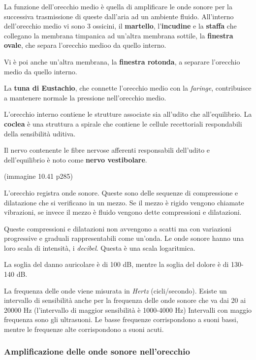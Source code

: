 \documentclass[]{article}
\begin{document}
La funzione dell'orecchio medio è quella di amplificare le onde sonore
per la successiva trasmissione di queste dall'aria ad un ambiente
fluido. All'interno dell'orecchio medio vi sono 3 ossicini, il
\textbf{martello}, l'\textbf{incudine} e la \textbf{staffa} che
collegano la membrana timpanica ad un'altra membrana sottile, la
\textbf{finestra ovale}, che separa l'orecchio medioo da quello interno.

Vi è poi anche un'altra membrana, la \textbf{finestra rotonda}, a
separare l'orecchio medio da quello interno.

La \textbf{tuna di Eustachio}, che connette l'orecchio medio con la
\emph{faringe}, contribuisce a mantenere normale la pressione
nell'orecchio medio.

L'orecchio interno contiene le strutture associate sia all'udito che
all'equilibrio. La \textbf{coclea} è una struttura a spirale che
contiene le cellule recettoriali respondabili della sensibilità uditiva.

Il nervo contenente le fibre nervose afferenti responsabili dell'udito e
dell'equilibrio è noto come \textbf{nervo vestibolare}.

(immagine 10.41 p285)

L'orecchio registra onde sonore. Queste sono delle sequenze di
compressione e dilatazione che si verificano in un mezzo. Se il mezzo è
rigido vengono chiamate vibrazioni, se invece il mezzo è fluido vengono
dette compressioni e dilatazioni.

Queste compressioni e dilatazioni non avvengono a scatti ma con
variazioni progressive e graduali rappresentabili come un'onda. Le onde
sonore hanno una loro scala di intensità, i \emph{decibel}. Questa è una
scala logaritmica.

La soglia del danno auricolare è di 100 dB, mentre la soglia del dolore
è di 130-140 dB.

La frequenza delle onde viene misurata in \emph{Hertz} (cicli/secondo).
Esiste un intervallo di sensibilità anche per la frequenza delle onde
sonore che va dai 20 ai 20000 Hz (l'intervallo di maggior sensibilità è
1000-4000 Hz) Intervalli con maggio frequenza sono gli ultrasuoni. Le
basse frequenze corrispondono a suoni bassi, mentre le frequenze alte
corrispondono a suoni acuti.

\subsubsection{Amplificazione delle onde sonore
nell'orecchio}\label{amplificazione-delle-onde-sonore-nellorecchio}
\end{document}
